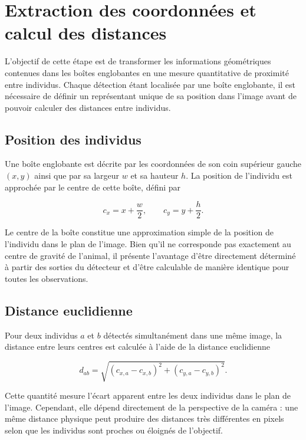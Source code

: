 \documentclass[11pt,a4paper]{report}
\begin{document}
\section{Extraction des coordonnées et calcul des distances}
\label{sec:distances}

L'objectif de cette étape est de transformer les informations géométriques
contenues dans les boîtes englobantes en une mesure quantitative de proximité
entre individus. Chaque détection étant localisée par une boîte englobante, il
est nécessaire de définir un représentant unique de sa position dans l'image
avant de pouvoir calculer des distances entre individus.

\subsection*{Position des individus}

Une boîte englobante est décrite par les coordonnées de son coin supérieur
gauche $(x,y)$ ainsi que par sa largeur $w$ et sa hauteur $h$. La position de
l'individu est approchée par le centre de cette boîte, défini par

\begin{equation}
c_x=x+\frac{w}{2},
\qquad
c_y=y+\frac{h}{2}.
\end{equation}

Le centre de la boîte constitue une approximation simple de la position de
l'individu dans le plan de l'image. Bien qu'il ne corresponde pas exactement au
centre de gravité de l'animal, il présente l'avantage d'être directement
déterminé à partir des sorties du détecteur et d'être calculable de manière
identique pour toutes les observations.

\subsection*{Distance euclidienne}

Pour deux individus $a$ et $b$ détectés simultanément dans une même image, la
distance entre leurs centres est calculée à l'aide de la distance euclidienne

\begin{equation}
d_{ab}
=
\sqrt{
(c_{x,a}-c_{x,b})^2+
(c_{y,a}-c_{y,b})^2
}.
\end{equation}

Cette quantité mesure l'écart apparent entre les deux individus dans le plan de
l'image. Cependant, elle dépend directement de la perspective de la caméra : une
même distance physique peut produire des distances très différentes en pixels
selon que les individus sont proches ou éloignés de l'objectif.
\end{document}
